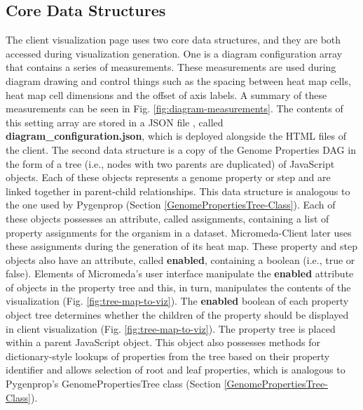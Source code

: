 \subsection{Core Data Structures} \label{visual-data-structures}

The client visualization page uses two core data structures, and they are both accessed during visualization generation. One is a diagram configuration array that contains a series of measurements. These measurements are used during diagram drawing and control things such as the spacing between heat map cells, heat map cell dimensions and the offset of axis labels. A summary of these measurements can be seen in Fig. \ref{fig:diagram-measurements}. The contents of this setting array are stored in a JSON file \cite{bray2014rfc}, called \textbf{diagram\_configuration.json}, which is deployed alongside the HTML files of the client. The second data structure is a copy of the Genome Properties DAG in the form of a tree (i.e., nodes with two parents are duplicated) of JavaScript objects. Each of these objects represents a genome property or step and are linked together in parent-child relationships. This data structure is analogous to the one used by Pygenprop (Section \ref{GenomePropertiesTree-Class}). Each of these objects possesses an attribute, called assignments, containing a list of property assignments for the organism in a dataset. Micromeda-Client later uses these assignments during the generation of its heat map. These property and step objects also have an attribute, called \textbf{enabled}, containing a boolean (i.e., true or false). Elements of Micromeda's user interface manipulate the \textbf{enabled} attribute of objects in the property tree and this, in turn, manipulates the contents of the visualization (Fig. \ref{fig:tree-map-to-viz}). The \textbf{enabled} boolean of each property object tree determines whether the children of the property should be displayed in client visualization (Fig. \ref{fig:tree-map-to-viz}). The property tree is placed within a parent JavaScript object. This object also possesses methods for dictionary-style lookups of properties from the tree based on their property identifier and allows selection of root and leaf properties, which is analogous to Pygenprop's GenomePropertiesTree class (Section \ref{GenomePropertiesTree-Class}).

